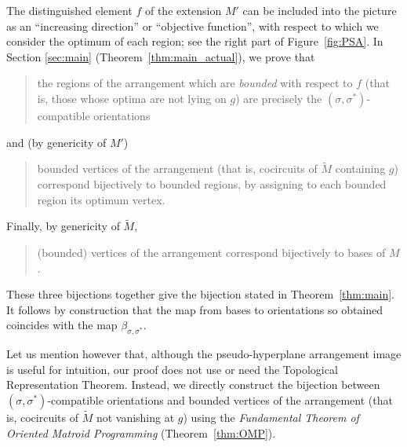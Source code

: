 \documentclass[12pt]{amsart}
\numberwithin{equation}{section}
\theoremstyle{definition}
\newcommand{\spencer}[1]{\todo[color=blue!30]{\rm #1 \\ \hfill --- S.}}
\newcommand{\paco}[1]{\todo[color=orange!30]{\footnotesize \rm #1 \\ \hfill --- P.}}
\newcommand{\chiho}[1]{\todo[color=green!30]{\rm #1 \\ \hfill --- Ch.}}
\newcommand{\Chiho}[1]{\todo[size=\tiny,inline,color=green!30]{#1 \\ \hfill --- Ch.}}
\begin{document}
The distinguished element $f$ of the extension $M'$ can be included into the picture as an ``increasing direction'' or ``objective function'', with respect to which we consider the optimum of each region; see the right part of Figure~\ref{fig:PSA}. 
In Section \ref{sec:main} (Theorem~\ref{thm:main_actual}), we prove that 
\begin{quote}
    the regions of the arrangement which are {\em bounded} with respect to $f$ (that is, those 
    whose optima are not lying on $g$) are precisely the $(\sigma,\sigma^*)$-compatible orientations
\end{quote}
   and (by genericity of $M'$)
\begin{quote}
    bounded vertices of the arrangement (that is, cocircuits of $\widetilde M$ containing $g$) correspond bijectively to bounded regions, by assigning to each bounded region its optimum vertex. 
\end{quote}  
    Finally, by genericity of $\widetilde{M}$, 
\begin{quote}
    (bounded) vertices of the arrangement correspond bijectively to bases of $M$. 
\end{quote}  
     These three bijections together give the bijection stated in Theorem~\ref{thm:main}. It follows by construction that the map  from bases to orientations so obtained coincides with the map $\beta_{\sigma,\sigma^*}$. 
     
     Let us mention however that, although the pseudo-hyperplane arrangement image is useful for intuition, our proof does not use or need the Topological Representation Theorem. Instead, we directly construct the bijection between $(\sigma,\sigma^*)$-compatible orientations and bounded vertices of the arrangement (that is, cocircuits of $\widetilde M$ not vanishing at $g$) using the \emph{Fundamental Theorem of Oriented Matroid Programming} (Theorem~\ref{thm:OMP}).


\end{document}
